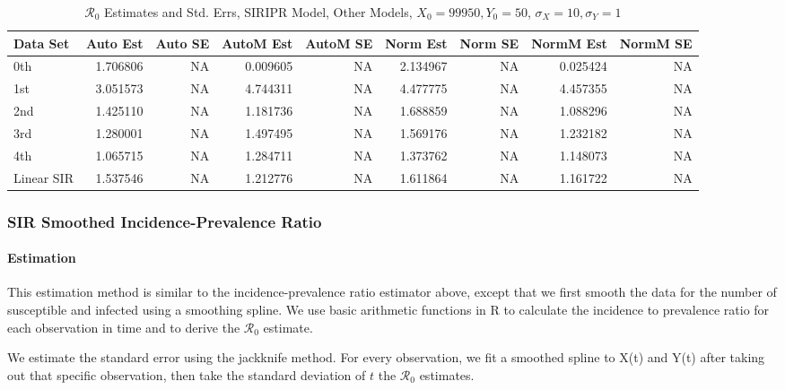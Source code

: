 \documentclass[12pt]{article}
\newcommand{\rr}{\ensuremath{\mathcal{R}_0}}
\begin{document}
\begin{table}[H]
	
	\caption{$\rr$ Estimates and Std. Errs, SIRIPR Model,
		Other Models, $X_0 = 99950, Y_0 = 50$, 
		$\sigma_X = 10, \sigma_Y = 1$}
	\begin{footnotesize}
		\hskip -1cm
		\begin{tabular}{l|r|r|r|r|r|r|r|r}
			\hline
			Data Set & Auto Est & Auto SE & AutoM Est & AutoM SE & Norm Est & Norm SE & NormM Est & NormM SE\\
			\hline
			0th & 1.706806 & NA & 0.009605 & NA & 2.134967 & NA & 0.025424 & NA\\
			\hline
			1st & 3.051573 & NA & 4.744311 & NA & 4.477775 & NA & 4.457355 & NA\\
			\hline
			2nd & 1.425110 & NA & 1.181736 & NA & 1.688859 & NA & 1.088296 & NA\\
			\hline
			3rd & 1.280001 & NA & 1.497495 & NA & 1.569176 & NA & 1.232182 & NA\\
			\hline
			4th & 1.065715 & NA & 1.284711 & NA & 1.373762 & NA & 1.148073 & NA\\
			\hline
			Linear SIR & 1.537546 & NA & 1.212776 & NA & 1.611864 & NA & 1.161722 & NA\\
			\hline
		\end{tabular}
	\end{footnotesize}
\end{table}

\subsubsection{SIR Smoothed Incidence-Prevalence Ratio}

\paragraph{Estimation}

This estimation method is similar to the incidence-prevalence ratio estimator above, except that we first smooth the data for the number of susceptible and infected using a smoothing spline. We use basic arithmetic functions in R to calculate the incidence to prevalence ratio for each observation in time and to derive the $\rr$ estimate.

We estimate the standard error using the jackknife method. For every observation, we fit a smoothed spline to X(t) and Y(t) after taking out that specific observation, then take the standard deviation of $t$ the $\rr$ estimates. 
\end{document}
